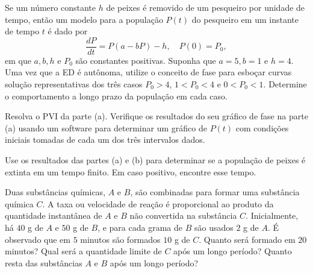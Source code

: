 \documentclass[oneside,12pt,a4paper]{report}
\begin{document}
        \begin{itensquestao}
            \item Se um número constante $h$ de peixes é removido de um pesqueiro por unidade de tempo, então um modelo para a população $P(t)$ do pesqueiro em um instante de tempo $t$ é dado por
            $$ \frac{dP}{dt} = P(a - bP) - h, \quad P(0) = P_0, $$
            em que $a, b, h$ e $P_0$ são constantes positivas. Suponha que $a = 5, b = 1$ e $h = 4$. Uma vez que a ED é autônoma, utilize o conceito de fase para esboçar curvas solução representativas dos três casos $P_0 > 4$, $1 < P_0 < 4$ e $0 < P_0 < 1$. Determine o comportamento a longo prazo da população em cada caso.
            \item Resolva o PVI da parte (a). Verifique os resultados do seu gráfico de fase na parte (a) usando um software para determinar um gráfico de $P(t)$ com condições iniciais tomadas de cada um dos três intervalos dados.
            \item Use os resultados das partes (a) e (b) para determinar se a população de peixes é extinta em um tempo finito. Em caso positivo, encontre esse tempo.
        \end{itensquestao}
    \begin{resolucao}
        
    \end{resolucao}

     Duas substâncias químicas, $A$ e $B$, são combinadas para formar uma substância química $C$. A taxa ou velocidade de reação é proporcional ao produto da quantidade instantânea de $A$ e $B$ não convertida na substância $C$. Inicialmente, há $40$ g de $A$ e $50$ g de $B$, e para cada grama de $B$ são usados $2$ g de $A$. É observado que em $5$ minutos são formados $10$ g de $C$. Quanto será formado em $20$ minutos? Qual será a quantidade limite de $C$ após um longo período? Quanto resta das substâncias $A$ e $B$ após um longo período?

    \begin{resolucao}
        
    \end{resolucao}
\end{document}
